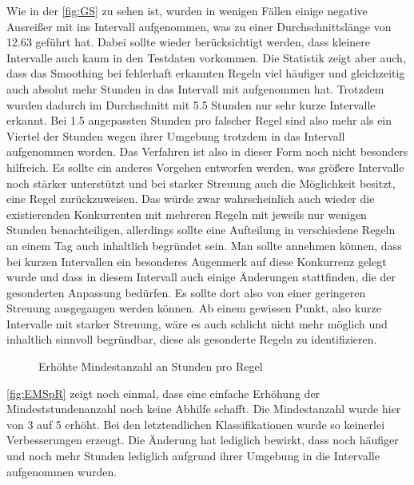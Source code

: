 Wie in der \autoref{fig:GS} zu sehen ist, wurden in wenigen Fällen einige negative Ausreißer mit ins Intervall aufgenommen, was zu einer Durchschnittslänge von 12.63 geführt hat. Dabei sollte wieder berücksichtigt werden, dass kleinere Intervalle auch kaum in den Testdaten vorkommen. Die Statistik zeigt aber auch, dass das Smoothing bei fehlerhaft erkannten Regeln viel häufiger und gleichzeitig auch absolut mehr Stunden in das Intervall mit aufgenommen hat. Trotzdem wurden dadurch im Durchschnitt mit 5.5 Stunden nur sehr kurze Intervalle erkannt. Bei 1.5 angepassten Stunden pro falscher Regel sind also mehr als ein Viertel der Stunden wegen ihrer Umgebung trotzdem in das Intervall aufgenommen worden. Das Verfahren ist also in dieser Form noch nicht besonders hilfreich. Es sollte ein anderes Vorgehen entworfen werden, was größere Intervalle noch stärker unterstützt und bei starker Streuung auch die Möglichkeit besitzt, eine Regel zurückzuweisen. Das würde zwar wahrscheinlich auch wieder die existierenden Konkurrenten mit mehreren Regeln mit jeweils nur wenigen Stunden benachteiligen, allerdings sollte eine Aufteilung in verschiedene Regeln an einem Tag auch inhaltlich begründet sein. Man sollte annehmen können, dass bei kurzen Intervallen ein besonderes Augenmerk auf diese Konkurrenz gelegt wurde und dass in diesem Intervall auch einige Änderungen stattfinden, die der gesonderten Anpassung bedürfen. Es sollte dort also von einer geringeren Streuung ausgegangen werden können. Ab einem gewissen Punkt, also kurze Intervalle mit starker Streuung, wäre es auch schlicht nicht mehr möglich und inhaltlich sinnvoll begründbar, diese als gesonderte Regeln zu identifizieren.
\begin{figure}[!ht]
	\caption{Erhöhte Mindestanzahl an Stunden pro Regel}
	\hspace*{\fill}%
		\hfill
	\hspace*{\fill}%
	\label{fig:EMSpR}
\end{figure}
\autoref{fig:EMSpR} zeigt noch einmal, dass eine einfache Erhöhung der Mindeststundenanzahl noch keine Abhilfe schafft. Die Mindestanzahl wurde hier von 3 auf 5 erhöht. Bei den letztendlichen Klassifikationen wurde so keinerlei Verbesserungen erzeugt. Die Änderung hat lediglich bewirkt, dass noch häufiger und noch mehr Stunden lediglich aufgrund ihrer Umgebung in die Intervalle aufgenommen wurden.\\

